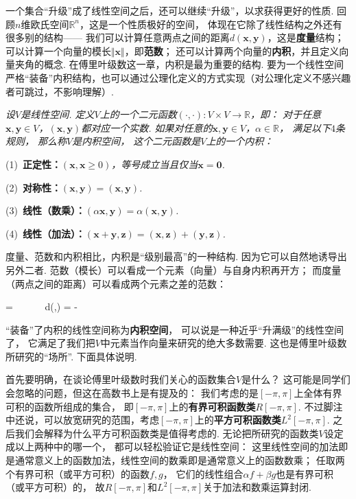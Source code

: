 一个集合“升级”成了线性空间之后，还可以继续“升级”，以求获得更好的性质.
回顾$n$维欧氏空间$\mathbb{R}^n$，这是一个性质极好的空间，
体现在它除了线性结构之外还有很多别的结构——
我们可以计算任意两点之间的距离$d(\bm{x},\bm{y})$，这是\textbf{度量}结构；
可以计算一个向量的模长$\Vert \bm{x} \Vert$，即\textbf{范数}；
还可以计算两个向量的\textbf{内积}，并且定义向量夹角的概念.
在傅里叶级数这一章，内积是最为重要的结构.
要为一个线性空间严格“装备”内积结构，也可以通过公理化定义的方式实现（对公理化定义不感兴趣者可跳过，不影响理解）.

\clearpage

\textit{设$V$是线性空间.
定义$V$上的一个二元函数$(\cdot,\cdot) : V \times V \to \mathbb{R}$，即：
对于任意$\bm{x},\bm{y} \in V$，$(\bm{x},\bm{y})$都对应一个实数.
如果对任意的$\bm{x},\bm{y} \in V$，$\alpha \in \mathbb{R}$，
满足以下$4$条规则，
那么称$V$是内积空间，
这个二元函数是$V$上的一个内积：}

(1)~\textbf{正定性：}\textit{$(\bm{x},\bm{x} \ge 0)$，等号成立当且仅当$\bm{x} = \bm{0}$.}

(2)~\textbf{对称性：}\textit{$(\bm{x},\bm{y}) = (\bm{x},\bm{y})$.}

(3)~\textbf{线性（数乘）：}\textit{$(\alpha \bm{x}, \bm{y}) = \alpha (\bm{x},\bm{y})$.}

(4)~\textbf{线性（加法）：}\textit{$(\bm{x}+\bm{y},\bm{z}) = (\bm{x},\bm{z}) + (\bm{y},\bm{z})$.}\vspace{1em}

度量、范数和内积相比，内积是“级别最高”的一种结构.
因为它可以自然地诱导出另外二者.
范数（模长）可以看成一个元素（向量）与自身内积再开方；
而度量（两点之间的距离）可以看成两个元素之差的范数：
\begin{eq1}
    \Vert {} \Vert  = ~~~~~~d(,) = \Vert {} -  \Vert
\end{eq1}

“装备”了内积的线性空间称为\textbf{内积空间}，
可以说是一种近乎“升满级”的线性空间了，
它满足了我们把$V$中元素当作向量来研究的绝大多数需要.
这也是傅里叶级数所研究的“场所”.
下面具体说明.

首先要明确，在谈论傅里叶级数时我们关心的函数集合$V$是什么？
这可能是同学们会忽略的问题，但这在高数书上是有提及的：
我们考虑的是$[-\pi,\pi]$上全体有界可积的函数所组成的集合，
即$[-\pi,\pi]$上的\textbf{有界可积函数类}$R[-\pi,\pi]$.
不过脚注中还说，可以放宽研究的范围，考虑$[-\pi,\pi]$上的\textbf{平方可积函数类}$L^2 [-\pi,\pi]$.
之后我们会解释为什么平方可积函数类是值得考虑的.
无论把所研究的函数类$V$设定成以上两种中的哪一个，
都可以轻松验证它是线性空间：
这里线性空间的加法即是通常意义上的函数加法，线性空间的数乘即是通常意义上的函数数乘；
任取两个有界可积（或平方可积）的函数$f,g$，
它们的线性组合$\alpha f + \beta g$也是有界可积（或平方可积）的，
故$R[-\pi,\pi]$和$L^2[-\pi,\pi]$关于加法和数乘运算封闭.


